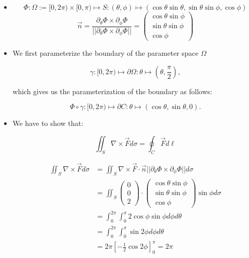 \documentclass[11pt]{article}
\begin{document}
\begin{solution}     
    \begin{itemize}
     \item $$\Phi: \Omega:= [0,2\pi)\times[0,\pi) \mapsto S: (\theta,\phi)\mapsto (\cos\theta\sin\theta,\sin\theta\sin\phi,\cos\phi) $$
			$$\vec{n} = \frac{\partial_{\theta}\Phi\times \partial_{\phi}\Phi}{||\partial_{\theta}\Phi\times \partial_{\phi}\Phi||} = \begin{pmatrix}\cos\theta\sin\phi \\ \sin\theta\sin\phi\\ \cos\phi\end{pmatrix}$$

     \item We first parameterize the boundary of the parameter space $\Omega$ 

$$\gamma:[0,2\pi) \mapsto \partial \Omega : \theta \mapsto(\theta, \frac{\pi}{2}),$$
			
which gives us the parameterization of the boundary as follows:

$$\Phi\circ \gamma:[0,2\pi) \mapsto \partial C : \theta \mapsto(\cos\theta,\sin\theta,0).$$

     \item 
        We have to show that:

$$
\iint_S \nabla \times \vec{F} d\sigma = \oint_C \vec{F} d\ell
$$

     \begin{align*}
\iint_S \nabla \times \vec{F} d\sigma &= \iint_S \nabla \times \vec{F}\cdot \vec{n}||\partial_{\theta}\Phi\times \partial_{\phi}\Phi|| d\sigma\\
 &= \iint_S \begin{pmatrix} 0\\ 0\\ 2 \end{pmatrix}\cdot \begin{pmatrix}\cos\theta\sin\phi \\ \sin\theta\sin\phi\\ \cos\phi\end{pmatrix}\sin\phi d\sigma\\
&= \int_0^{2\pi}\int_0^{\pi} 2\cos\phi\sin\phi d\phi d\theta\\
&= \int_0^{2\pi}\int_0^{\pi} \sin2\phi d\phi d\theta\\
&= 2\pi \left[ -\frac{1}{2}\cos2\phi \right]_0^{\pi} = 2\pi\\
     \end{align*}   


\end{itemize}
\end{solution}
\end{document}
